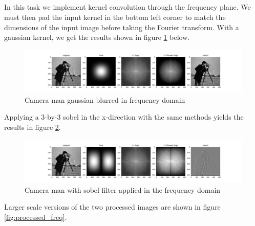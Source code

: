 \documentclass[]{article}
\begin{document}
\subsection{}
In this task we implement kernel convolution through the frequency plane. We must then pad the input kernel in the bottom left corner to match the dimensions of the input image before taking the Fourier transform. With a gaussian kernel, we get the results shown in figure \ref{fig:camera_gauss} below.
\begin{figure}[H]
\centering
\includegraphics[width=\textwidth]{camera_gauss}
\caption{Camera man gaussian blurred in frequency domain}
\label{fig:camera_gauss}
\end{figure}
Applying a 3-by-3 sobel in the x-direction with the same methods yields the results in figure \ref{fig:camera_sobel}.
\begin{figure}[H]
\centering
\includegraphics[width=\textwidth]{camera_sobel}
\caption{Camera man with sobel filter applied in the frequency domain}
\label{fig:camera_sobel}
\end{figure}
Larger scale versions of the two processed images are shown in figure \ref{fig:processed_freq}.
\end{document}
